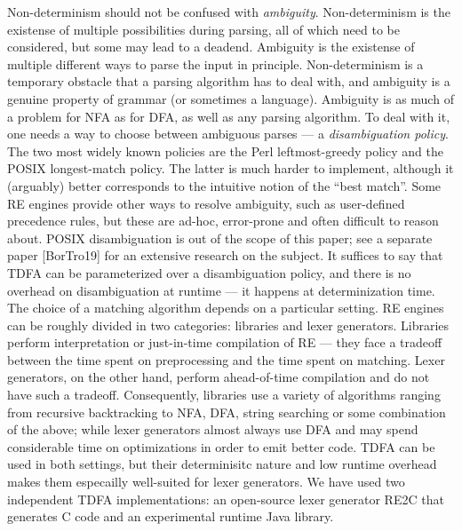 \documentclass[]{article}
\begin{document}
Non-determinism should not be confused with \emph{ambiguity}.
Non-determinism is the existense of multiple possibilities during parsing,
all of which need to be considered, but some may lead to a deadend.
Ambiguity is the existense of multiple different ways to parse the input in principle.
Non-determinism is a temporary obstacle that a parsing algorithm has to deal with,
and ambiguity is a genuine property of grammar (or sometimes a language).
%
Ambiguity is as much of a problem for NFA as for DFA, as well as any parsing algorithm.
To deal with it, one needs a way to choose between ambiguous parses --- a \emph{disambiguation policy}.
The two most widely known policies are the Perl leftmost-greedy policy and the POSIX longest-match policy.
The latter is much harder to implement, although it (arguably) better corresponds to the intuitive notion of the ``best match''.
Some RE engines provide other ways to resolve ambiguity, such as user-defined precedence rules,
but these are ad-hoc, error-prone and often difficult to reason about.
POSIX disambiguation is out of the scope of this paper; see a separate paper [BorTro19] for an extensive research on the subject.
It suffices to say that TDFA can be parameterized over a disambiguation policy,
and there is no overhead on disambiguation at runtime --- it happens at determinization time.
\\

The choice of a matching algorithm depends on a particular setting.
RE engines can be roughly divided in two categories: libraries and lexer generators.
Libraries perform interpretation or just-in-time compilation of RE ---
they face a tradeoff between the time spent on preprocessing and the time spent on matching.
Lexer generators, on the other hand, perform ahead-of-time compilation and do not have such a tradeoff.
Consequently, libraries use a variety of algorithms ranging from recursive backtracking to NFA, DFA, string searching or some combination of the above;
while lexer generators almost always use DFA and may spend considerable time on optimizations in order to emit better code.
TDFA can be used in both settings, but their determinisitc nature and low runtime overhead makes them especailly well-suited for lexer generators.
We have used two independent TDFA implementations: an open-source lexer generator RE2C that generates C code
and an experimental runtime Java library.
\\
\end{document}
